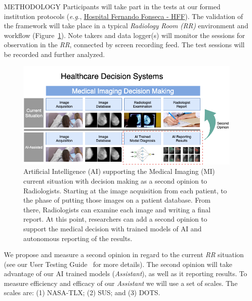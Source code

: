 \documentclass[final]{beamer}
\begin{document}
\begin{frame}[t, fragile = singleslide]{}
\begin{columns}[t]
\begin{column}{0.45\textwidth}
\begin{block}{METHODOLOGY}
Participants will take part in the tests at our formed institution protocols (\textit{e.g.}, \hyperlink{http://hff.min-saude.pt/}{Hospital Fernando Fonseca - HFF}). The validation of the framework will take place in a typical \textit{Radiology Room (RR)} environment and workflow (Figure~\ref{fig:fig001}). Note takers and data logger(s) will monitor the sessions for observation in the \textit{RR}, connected by screen recording feed. The test sessions will be recorded and further analyzed.

\begin{figure}[!htb]
\centering
\caption{Artificial Intelligence (AI) supporting the Medical Imaging (MI) current situation with decision making as a second opinion to Radiologists. Starting at the image acquisition from each patient, to the phase of putting those images on a patient database. From there, Radiologists can examine each image and writing a final report. At this point, researchers can add a second opinion to support the medical decision with trained models of AI and autonomous reporting of the results.}
\label{fig:fig001}
\includegraphics[width = \columnwidth]{./figures/fig001}
\end{figure}

We propose and measure a second opinion in regard to the current \textit{RR} situation (see our User Testing Guide~\cite{https://doi.org/10.13140/rg.2.2.16566.14403/1} for more details). The second opinion will take advantage of our AI trained models (\textit{Assistant}), as well as it reporting results. To measure efficiency and efficacy of our \textit{Assistant} we will use a set of scales. The scales are: (1) NASA-TLX; (2) SUS; and (3) DOTS.

\end{block}

\end{column}


\end{columns}
\end{frame}
\end{document}
